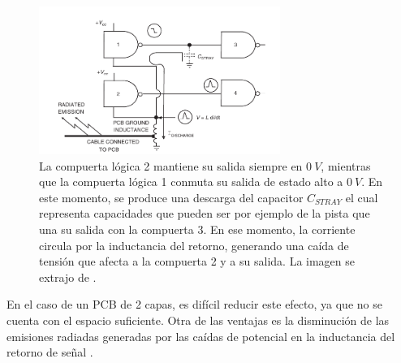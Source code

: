 
\begin{figure}[H]
    \centering
    \includegraphics[width=0.7\textwidth]{img/ground_bounce.png}
    \caption{La compuerta lógica 2 mantiene su salida siempre en $0 \ V$, mientras que la compuerta lógica 1 conmuta su salida de estado alto a $0 \ V$. En este momento, se produce una descarga del capacitor $C_{STRAY}$ el cual representa capacidades que pueden ser por ejemplo de la pista que una su salida con la compuerta 3. En ese momento, la corriente circula por la inductancia del retorno, generando una caída de tensión que afecta a la compuerta 2 y a su salida. La imagen se extrajo de \cite[p.~381]{ott2011electromagnetic}.}
    \label{fig:ground_bounce}
\end{figure}

En el caso de un PCB de 2 capas, es difícil reducir este efecto, ya que no se cuenta con el espacio suficiente. Otra de las ventajas es la disminución de las emisiones radiadas generadas por las caídas de potencial en la inductancia del retorno de señal \cite[p.~477]{ott2011electromagnetic}.







